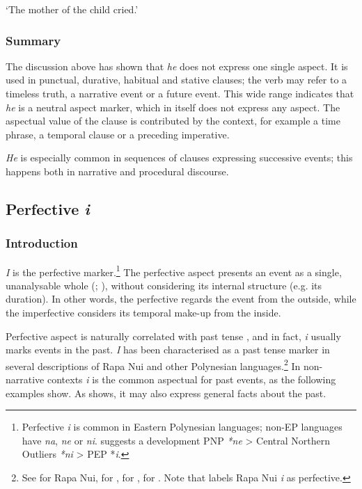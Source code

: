 \glt 
‘The mother of the child cried.’ \textstyleExampleref{[R338.008]} 
\z

\subsubsection[Summary]{Summary}\label{sec:7.2.3.4}

The discussion above has shown that \textit{he} does not express one single aspect. It is used in punctual, durative, habitual and stative clauses; the verb may refer to a timeless truth, a narrative event or a future event. This wide range indicates that \textit{he} is a neutral aspect marker, which in itself does not express any aspect. The aspectual value of the clause is contributed by the context, for example a time phrase, a temporal clause or a preceding imperative.

\textit{He} is especially common in sequences of clauses expressing successive events; this happens both in narrative and procedural discourse.
\subsection{Perfective \textit{i}}\label{sec:7.2.4}
\subsubsection[Introduction]{Introduction}\label{sec:7.2.4.1}

\textit{I} is the perfective marker.\footnote{\label{fn:319}Perfective \textit{i} is common in Eastern Polynesian languages; non-EP languages have \textit{na}, \textit{ne} or \textit{ni}. \citet[314]{Wilson2012} suggests a development PNP \textit{*ne} {\textgreater} Central Northern Outliers \textit{*ni} {\textgreater} PEP *\textit{i}.} The perfective aspect presents an event as a single, unanalysable whole (\citealt[3]{Comrie1976}; \citealt[35]{Dixon2012}), without considering its internal structure (e.g. its duration). In other words, the perfective regards the event from the outside, while the imperfective considers its temporal make-up from the inside.

Perfective aspect is naturally correlated with past tense \citep[72]{Comrie1976}, and in fact, \textit{i} usually marks events in the past. \textit{I} has been characterised as a past tense marker in several descriptions of Rapa Nui and other Polynesian languages.\footnote{\label{fn:320}See \citet[156]{DuFeu1996} for Rapa Nui, \citet{MutuTeìkitutoua2002} for , \citet[172]{AcadémieTahitienne1986} for , \citet[34]{Biggs1973} for . Note that \citet[153]{Chapin1978} labels Rapa Nui \textit{i} as perfective.} In non-narrative contexts \textit{i} is the common aspectual for past events, as the following examples show. As  shows, it may also express general facts about the past.

